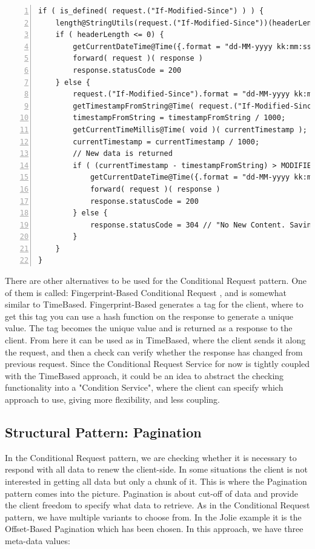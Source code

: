 \documentclass[12pt]{article}
\begin{document}
\begin{lstlisting}[caption=Courier operations for the Conditional Request service, 
    captionpos=b, label={lst:condreqCourier}, frame=single, breaklines=true, numbers=left, basicstyle=\scriptsize]
if ( is_defined( request.("If-Modified-Since") ) ) {
    length@StringUtils(request.("If-Modified-Since"))(headerLength);
    if ( headerLength <= 0) {
        getCurrentDateTime@Time({.format = "dd-MM-yyyy kk:mm:ss"})(lastModified);
        forward( request )( response )
        response.statusCode = 200
    } else {
        request.("If-Modified-Since").format = "dd-MM-yyyy kk:mm:ss";
        getTimestampFromString@Time( request.("If-Modified-Since") )( timestampFromString );
        timestampFromString = timestampFromString / 1000;
        getCurrentTimeMillis@Time( void )( currentTimestamp );
        currentTimestamp = currentTimestamp / 1000;
        // New data is returned
        if ( (currentTimestamp - timestampFromString) > MODIFIED_TIMESTAMP ) {
            getCurrentDateTime@Time({.format = "dd-MM-yyyy kk:mm:ss"})(lastModified);
            forward( request )( response )
            response.statusCode = 200
        } else {
            response.statusCode = 304 // "No New Content. Saving Bandwidth";
        }
    }
}
\end{lstlisting}

There are other alternatives to be used for the Conditional Request pattern. One of them is called: Fingerprint-Based Conditional Request \cite{CondReqRFC}, and is somewhat similar to TimeBased. Fingerprint-Based generates a tag for the client, where to get this tag you can use a hash function on the response to generate a unique value. The tag becomes the unique value and is returned as a response to the client. From here it can be used as in TimeBased, where the client sends it along the request, and then a check can verify whether the response has changed from previous request. Since the Conditional Request Service for now is tightly coupled with the TimeBased approach, it could be an idea to abstract the checking functionality into a "Condition Service", where the client can specify which approach to use, giving more flexibility, and less coupling.\\

\subsection{Structural Pattern: Pagination}
In the Conditional Request pattern, we are checking whether it is necessary to respond with all data to renew the client-side. In some situations the client is not interested in getting all data but only a chunk of it. This is where the Pagination pattern \cite{PaginationMAPI} comes into the picture. Pagination is about cut-off of data and provide the client freedom to specify what data to retrieve. As in the Conditional Request pattern, we have multiple variants to choose from. In the Jolie example it is the Offset-Based Pagination which has been chosen. In this approach, we have three meta-data values: 
\end{document}
